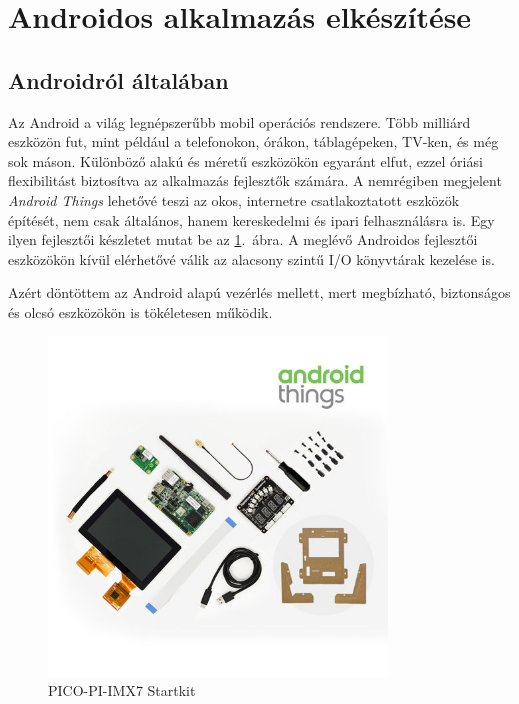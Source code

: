 \documentclass[../main.tex]{subfiles}
\begin{document}
\section{Androidos alkalmazás elkészítése}
    \subsection{Androidról általában}
        Az Android a világ legnépszerűbb mobil operációs rendszere. Több milliárd eszközön fut, mint például a telefonokon, órákon, táblagépeken, TV-ken, és még sok máson. 
        Különböző alakú és méretű eszközökön egyaránt elfut, ezzel óriási flexibilitást biztosítva az alkalmazás fejlesztők számára. 
        A nemrégiben megjelent \textit{Android Things} lehetővé teszi az okos, internetre csatlakoztatott eszközök építését, nem csak általános, hanem kereskedelmi és ipari felhasználásra is. Egy ilyen fejlesztői készletet mutat be az \ref{fig:android_things}.~ábra. A meglévő Androidos fejlesztői eszközökön kívül elérhetővé válik az alacsony szintű I/O könyvtárak kezelése is. 
        
        Azért döntöttem az Android alapú vezérlés mellett, mert megbízható, biztonságos és olcsó eszközökön is tökéletesen működik. 
        
        \begin{figure}[h!] %
            \centering
            \includegraphics[height=9cm]{android_res/pico-pi-imx7-startkit.jpg}
            \caption{PICO-PI-IMX7 Startkit}
            \label{fig:android_things}
        \end{figure}
        
\end{document}
